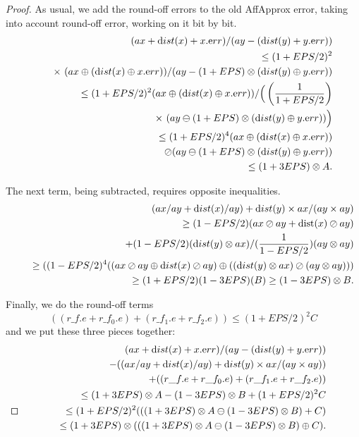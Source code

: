 \begin{proof}{}
As usual, we add the round-off errors to the old AffApprox error, 
taking into account round-off error, working on it bit by bit.
\begin{eqnarray*}
 &&\hskip-16pt (ax + {\textrm dist}(x) + x.{\textrm err})/(ay - ({\textrm dist}(y) + y.{\textrm err}))\\
&&  \le (1 + EPS/2)^2 \\
&&\quad \times \ (ax \oplus ({\textrm dist}(x)
\oplus x.{\textrm err}))/
         (ay - (1 + EPS) \otimes ({\textrm dist}(y) \oplus y.{\textrm err}))\\
&&  \le (1 + EPS/2)^2 (ax \oplus ({\textrm dist}(x) \oplus
x.{\textrm err}))/
         \Big(\left({1 \over 1 + EPS/2}\right) \\
&&\quad\times \ (ay \ominus (1 + EPS) \otimes ({\textrm dist}(y) \oplus y.{\textrm err}))\Big)\\
&& \le (1 + EPS/2)^4 (ax
\oplus ({\textrm dist}(x) \oplus x.{\textrm err}))\\
&&\quad \oslash
         (ay \ominus (1 + EPS) \otimes ({\textrm dist}(y) \oplus y.{\textrm err}))\\
&& \le   (1 + 3EPS) \otimes A.
\end{eqnarray*}

The next term, being subtracted, requires opposite inequalities.
\begin{eqnarray*}
&&(ax/ay + {\textrm dist}(x)/ay) + {\textrm dist}(y) \times ax / (ay \times ay)\\
&&\quad \ge (1-EPS/2)(ax \oslash ay + \mathrm {dist}(x)
\oslash ay) \\
&&\qquad +  (1-EPS/2) ({\textrm dist}(y) \otimes ax )/ ({1 \over 1 - EPS/2})(ay \otimes ay)\\
&&\quad \ge ((1-EPS/2)^4 ((ax
\oslash ay \oplus {\textrm dist}(x) \oslash ay) \oplus  (({\textrm dist}(y) \otimes ax) \oslash (ay \otimes ay)))\\
&&\quad \ge (1 +
EPS/2)(1 - 3EPS) (B)  \ge (1 - 3EPS) \otimes B.\end{eqnarray*}

Finally, we do the round-off terms 
$$((r\_f.e + r\_f_0.e) + (r\_f_1.e + r\_f_2.e)) \le (1 + EPS/2)^2 C $$
and we put these three pieces together:
\begin{eqnarray*}
&&
(ax + {\textrm dist}(x) + x.{\textrm err})/(ay - ({\textrm dist}(y) + y.{\textrm err}))
\\
&&\qquad  - 
((ax/ay + {\textrm dist}(x)/ay) + {\textrm dist}(y) \times ax / (ay \times ay))\\
&&\qquad
+ ((r\_f.e + r\_f_0.e) + (r\_f_1.e + r\_f_2.e))
\\
&&\quad \le 
(1 + 3EPS) \otimes A - (1 - 3EPS) \otimes B + (1 + EPS/2)^2 C\\
&&\quad \le (1+EPS/2)^2 (
((1 + 3EPS) \otimes A \ominus (1 - 3EPS) \otimes B)
 + C
) \\
&&\quad \le (1+3EPS) \otimes (
((1 + 3EPS) \otimes A \ominus (1 - 3EPS) \otimes B)
 \oplus C
) . \\
\noalign{\vskip-36pt}
\end{eqnarray*}
\end{proof}

